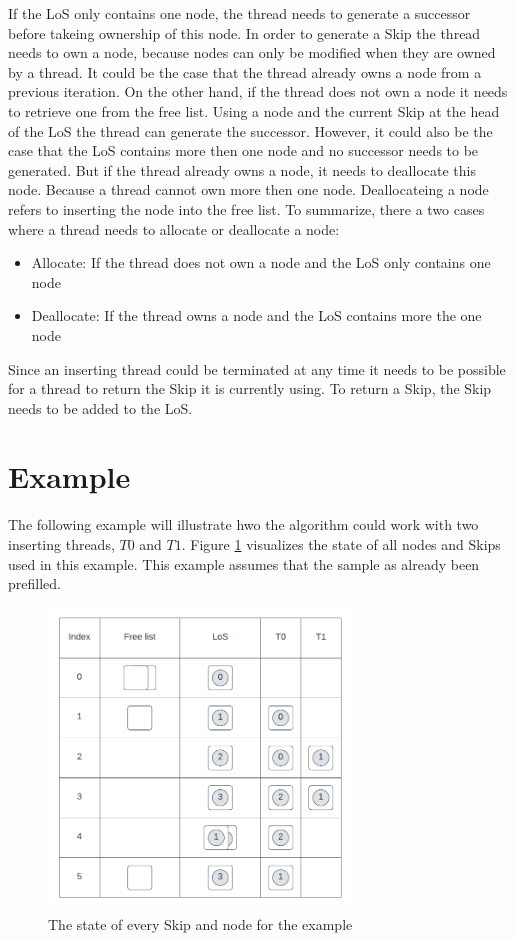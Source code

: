 \documentclass[sigconf,nonacm]{acmart}
\begin{document}
        If the LoS only contains one node, the thread needs to generate a successor before takeing ownership of this node. In order to generate a Skip the thread needs to own a node, because nodes can only be modified when they are owned by a thread. It could be the case that the thread already owns a node from a previous iteration. On the other hand, if the thread does not own a node it needs to retrieve one from the free list. Using a node and the current Skip at the head of the LoS the thread can generate the successor. However, it could also be the case that the LoS contains more then one node and no successor needs to be generated. But if the thread already owns a node, it needs to deallocate this node. Because a thread cannot own more then one node. Deallocateing a node refers to inserting the node into the free list. To summarize, there a two cases where a thread needs to allocate or deallocate a node: 
        \begin{itemize}
            \item Allocate: If the thread does not own a node and the LoS only contains one node
            \item Deallocate: If the thread owns a node and the LoS contains more the one node
        \end{itemize}

        Since an inserting thread could be terminated at any time it needs to be possible for a thread to return the Skip it is currently using. To return a Skip, the Skip needs to be added to the LoS.
        
    \section{Example}
        The following example will illustrate hwo the algorithm could work with two inserting threads, $T0$ and $T1$. Figure \ref{fig:example} visualizes the state of all nodes and Skips used in this example. This example assumes that the sample as already been prefilled.
        \begin{figure}[H]
            \includegraphics[height=8cm]{figure6.pdf}
            \caption{The state of every Skip and node for the example}
            \label{fig:example}
        \end{figure}
\end{document}
